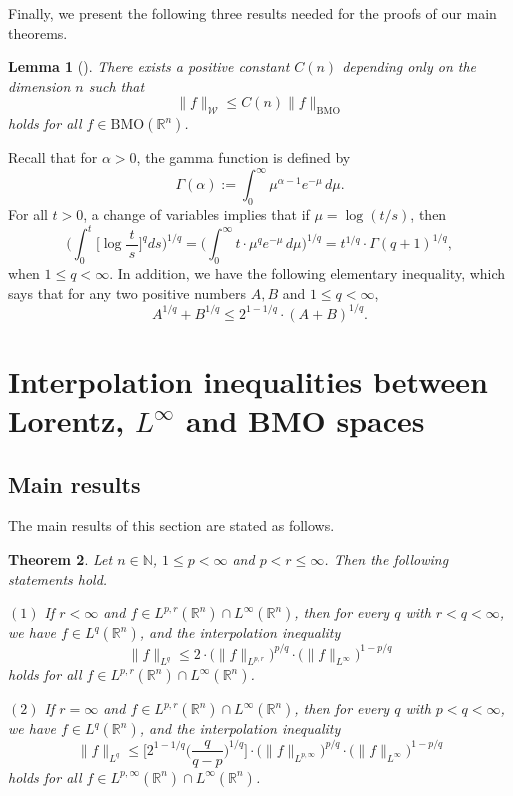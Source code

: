 \documentclass{birkjour}
\newtheorem{thm}{Theorem}[section]
\newtheorem{lem}[thm]{Lemma}
\theoremstyle{definition}
\theoremstyle{remark}
\numberwithin{equation}{section}
\begin{document}
Finally, we present the following three results needed for the proofs of our main theorems.
\begin{lem}[\cite{Kozono2}]\label{lemmaw}
There exists a positive constant $C(n)$ depending only on the dimension $n$ such that
\begin{equation*}
\|f\|_{\mathcal{W}}\leq C(n)\|f\|_{\mathrm{BMO}}
\end{equation*}
holds for all $f\in \mathrm{BMO}(\mathbb R^n)$.
\end{lem}

Recall that for $\alpha>0$, the gamma function is defined by
\begin{equation*}
\Gamma(\alpha):=\int_0^{\infty}\mu^{\alpha-1} e^{-\mu}\,d\mu.
\end{equation*}
For all $t>0$, a change of variables implies that if $\mu=\log(t/s)$, then
\begin{equation}\label{weneed}
\bigg(\int_0^{t}\Big[\log\frac{t}{\,s\,}\Big]^qds\bigg)^{1/q}
=\bigg(\int_0^{\infty}t\cdot\mu^q e^{-\mu}\,d\mu\bigg)^{1/q}=t^{1/q}\cdot\Gamma(q+1)^{1/q},
\end{equation}
when $1\leq q<\infty$. In addition, we have the following elementary inequality, which says that for any two positive numbers $A,B$ and $1\leq q<\infty$,
\begin{equation}\label{elemen}
A^{1/q}+B^{1/q}\leq 2^{1-1/q}\cdot(A+B)^{1/q}.
\end{equation}

\section{Interpolation inequalities between Lorentz, $L^{\infty}$ and BMO spaces}
\subsection{Main results}
The main results of this section are stated as follows.

\begin{thm}\label{thmwang1}
Let $n\in \mathbb{N}$, $1\leq p<\infty$ and $p<r\leq\infty$. Then the following statements hold.

$(1)$ If $r<\infty$ and $f\in L^{p,r}(\mathbb R^n)\cap{L^\infty}(\mathbb R^n)$, then for every $q$ with $r<q<\infty$, we have $f\in L^q(\mathbb R^n)$, and the interpolation inequality
\begin{equation*}
\|f\|_{L^q}\leq 2\cdot\big(\|f\|_{L^{p,r}}\big)^{p/q}\cdot\big(\|f\|_{L^\infty}\big)^{1-p/q}
\end{equation*}
holds for all $f\in L^{p,r}(\mathbb R^n)\cap{L^\infty}(\mathbb R^n)$.

$(2)$ If $r=\infty$ and $f\in L^{p,r}(\mathbb R^n)\cap{L^\infty}(\mathbb R^n)$, then for every $q$ with $p<q<\infty$, we have $f\in L^q(\mathbb R^n)$, and the interpolation inequality
\begin{equation*}
\|f\|_{L^q}\leq \Big[2^{1-1/q}\Big(\frac{q}{q-p}\Big)^{1/q}\Big]
\cdot\big(\|f\|_{L^{p,\infty}}\big)^{p/q}\cdot\big(\|f\|_{L^\infty}\big)^{1-p/q}
\end{equation*}
holds for all $f\in L^{p,\infty}(\mathbb R^n)\cap{L^\infty}(\mathbb R^n)$.
\end{thm}
\end{document}
